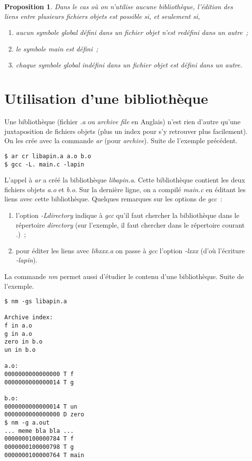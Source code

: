 \documentclass{article}
\newtheorem{proposition}{Proposition}
\begin{document}
\begin{proposition}
Dans le cas o{\`u} on n'utilise aucune biblioth{\`e}que,
l'{\'e}dition des liens entre plusieurs fichiers objets est possible si,
et seulement si, 
\begin{enumerate}
\item	aucun symbole global d{\'e}fini dans un fichier objet n'est 
	red{\'e}fini dans un autre~;
\item	le symbole {\em main} est d{\'e}fini~;
\item	chaque symbole global ind{\'e}fini dans un fichier objet est d{\'e}fini
	dans un autre.
\end{enumerate}
\end{proposition}

\section{Utilisation d'une biblioth{\`e}que}

Une biblioth{\`e}que (fichier \emph{.a} ou {\em archive file} en Anglais)
n'est rien d'autre qu'une juxtaposition de fichiers objets (plus un
index pour s'y retrouver plus facilement).
On les cr{\'e}e avec la commande {\em ar} (pour {\em archive}).
Suite de l'exemple pr{\'e}c{\'e}dent.

\begin{verbatim}
$ ar cr libapin.a a.o b.o
$ gcc -L. main.c -lapin
\end{verbatim}

L'appel {\`a} {\em ar} a cr{\'e}{\'e} la biblioth{\`e}que {\em libapin.a}.
Cette biblioth{\`e}que contient les deux fichiers objets {\em a.o} et {\em b.o}.
Sur la derni{\`e}re ligne, on a compil{\'e} {\em main.c} en {\'e}ditant les liens 
avec cette biblioth{\`e}que. Quelques remarques sur les options de {\em gcc}~:
\begin{enumerate}
\item	l'option \emph{-Ldirectory} indique {\`a} {\em gcc} qu'il faut chercher
	la biblioth{\`e}que dans le r{\'e}pertoire {\em directory} (sur l'exemple,
	il faut chercher dans le r{\'e}pertoire courant \emph{.})~;
\item	pour {\'e}diter les liens avec {\em libxxx.a} on passe {\`a} {\em gcc}
	l'option \emph{-lxxx} (d'o{\`u} l'{\'e}criture \emph{-lapin}).
\end{enumerate}
La commande {\em nm} permet aussi d'{\'e}tudier le contenu d'une biblioth{\`e}que.
Suite de l'exemple.

\begin{verbatim}
$ nm -gs libapin.a

Archive index:
f in a.o
g in a.o
zero in b.o
un in b.o

a.o:
0000000000000000 T f
0000000000000014 T g

b.o:
0000000000000014 T un
0000000000000000 D zero
$ nm -g a.out
... meme bla bla ...
0000000100000784 T f
0000000100000798 T g
0000000100000764 T main
\end{verbatim}
\end{document}

